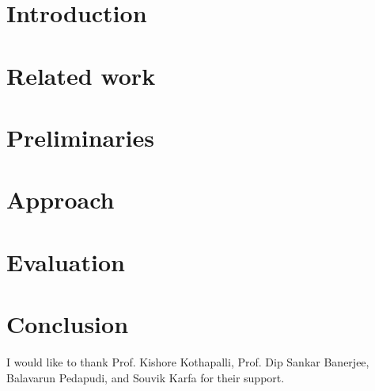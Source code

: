 \documentclass[sigconf,nonacm]{acmart}
\begin{document}





\maketitle

\section{Introduction}
\label{sec:introduction}


\section{Related work}
\label{sec:related}


\section{Preliminaries}
\label{sec:preliminaries}


\section{Approach}
\label{sec:approach}


\section{Evaluation}
\label{sec:evaluation}


\section{Conclusion}
\label{sec:conclusion}


\begin{acks}
I would like to thank Prof. Kishore Kothapalli,  Prof. Dip Sankar Banerjee, Balavarun Pedapudi, and Souvik Karfa for their support.
\end{acks}



\end{document}

